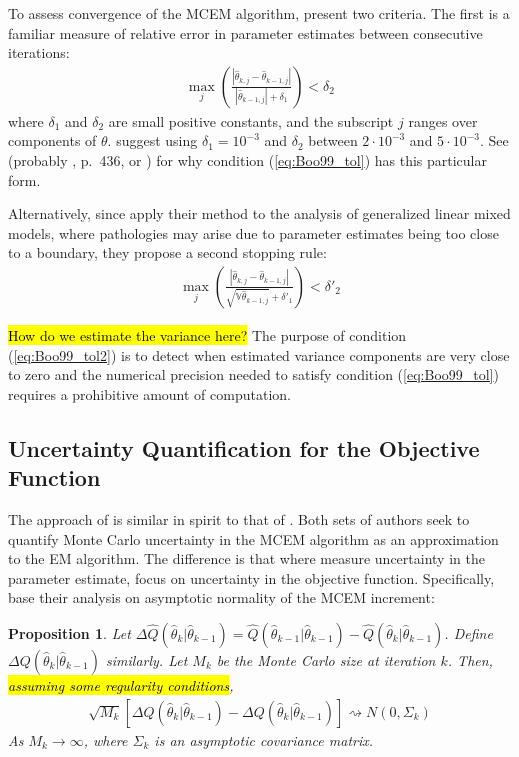 \documentclass[11pt, oneside]{article}   	%
\newcommand{\bV}{\mathbb{V}}
\newtheorem{proposition}{Proposition}[section]
\begin{document}
To assess convergence of the MCEM algorithm, \citeauthor{Boo99} present two criteria. The first is a familiar measure of relative error in parameter estimates between consecutive iterations:
%
\begin{align}
    \max_j \left( \frac{\left| \hat{\theta}_{k, j} - \hat{\theta}_{k-1,j} \right|}{\left| \hat{\theta}_{k-1,j} \right| + \delta_1} \right) < \delta_2 \label{eq:Boo99_tol}
\end{align}
%
where $\delta_1$ and $\delta_2$ are small positive constants, and the subscript $j$ ranges over components of $\theta$. \citeauthor{Boo99} suggest using $\delta_1 = 10^{-3}$ and $\delta_2$ between $2 \cdot 10^{-3}$ and $5 \cdot 10^{-3}$. See \citep{need} (probably \citealp{Sea06}, p.\ 436, or \citealp{Mar63}) for why condition (\ref{eq:Boo99_tol}) has this particular form.

Alternatively, since \citeauthor{Boo99} apply their method to the analysis of generalized linear mixed models, where pathologies may arise due to parameter estimates being too close to a boundary, they propose a second stopping rule:
%
\begin{align}
    \max_j \left( \frac{\left| \hat{\theta}_{k, j} - \hat{\theta}_{k-1,j} \right|}{\sqrt{\bV \hat{\theta}_{k-1,j}} + \delta'_1} \right) < \delta'_2 \label{eq:Boo99_tol2}
\end{align}

\hl{How do we estimate the variance here?} The purpose of condition (\ref{eq:Boo99_tol2}) is to detect when estimated variance components are very close to zero and the numerical precision needed to satisfy condition (\ref{eq:Boo99_tol}) requires a prohibitive amount of computation.

\subsection{Uncertainty Quantification for the Objective Function \citep{Caf05}}

The approach of \citet{Caf05} is similar in spirit to that of \citet{Boo99}. Both sets of authors seek to quantify Monte Carlo uncertainty in the MCEM algorithm as an approximation to the EM algorithm. The difference is that where \citeauthor{Boo99} measure uncertainty in the parameter estimate, \citeauthor{Caf05} focus on uncertainty in the objective function. Specifically, \citeauthor{Caf05} base their analysis on asymptotic normality of the MCEM increment:
%
\begin{proposition}
    \label{thm:Caf_normality}
    Let $\Delta \hat{Q}(\hat{\theta}_k|\hat{\theta}_{k-1}) = \hat{Q}(\hat{\theta}_{k-1}|\hat{\theta}_{k-1}) - \hat{Q}(\hat{\theta}_k|\hat{\theta}_{k-1})$. Define $\Delta Q(\hat{\theta}_k|\hat{\theta}_{k-1})$ similarly. Let $M_k$ be the Monte Carlo size at iteration $k$. Then, \hl{assuming some regularity conditions},
    \begin{align}
        \sqrt{M_k} \left[ \Delta \hat{Q}(\hat{\theta}_k|\hat{\theta}_{k-1}) - \Delta Q(\hat{\theta}_k|\hat{\theta}_{k-1}) \right] \rightsquigarrow N(0, \Sigma_k)
    \end{align}
    As $M_k \rightarrow \infty$, where $\Sigma_k$ is an asymptotic covariance matrix.
\end{proposition}
\end{document}
